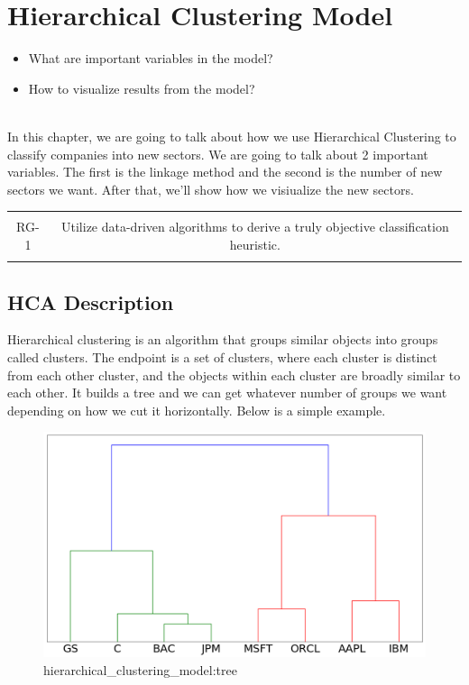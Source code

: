 \documentclass[../main.tex]{subfiles}
\begin{document}
\chapter{Hierarchical Clustering Model} \label{hierarchical_clustering_model}

\begin{itemize}
    \item What are important variables in the model?
    \item How to visualize results from the model?
    \\~\\
\end{itemize}

In this chapter, we are going to talk about how we use Hierarchical Clustering to classify companies into new sectors. We are going to talk about 2 important variables. The first is the linkage method and the second is the number of new sectors we want. After that, we'll show how we visiualize the new sectors.

\begin{table}[h!]
    \centering
    \begin{tabular}{| c | c |}
        \hline
        &  \\
        RG-1 & Utilize data-driven algorithms to derive a truly objective classification heuristic. \\
        & \\
        \hline
    \end{tabular}
\end{table}

\section{HCA Description}

Hierarchical clustering is an algorithm that groups similar objects into groups called clusters. The endpoint is a set of clusters, where each cluster is distinct from each other cluster, and the objects within each cluster are broadly similar to each other. It builds a tree and we can get whatever number of groups we want depending on how we cut it horizontally. Below is a simple example.

\begin{figure}[H]
    \centering
    \includegraphics[scale=0.4]{images/tree.png}
    \caption{hierarchical_clustering_model:tree}
    \label{fig:hierarchical_clustering_model:tree}
\end{figure}
\end{document}
